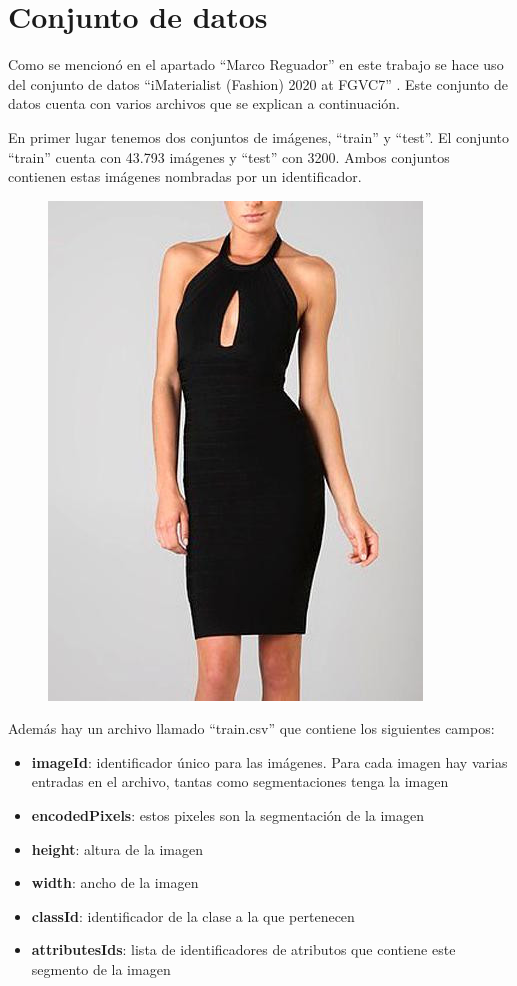\documentclass[12pt]{report} %
\begin{document}
	\section{Conjunto de datos}
	Como se mencionó en el apartado ``Marco Reguador'' en este trabajo se hace uso del conjunto de datos 
	``iMaterialist (Fashion) 2020 at FGVC7'' \cite{imaterialist}. Este conjunto de datos cuenta con varios archivos que se 
	explican a continuación.

	En primer lugar tenemos dos conjuntos de imágenes, ``train'' y ``test''. El conjunto ``train'' cuenta con 43.793 imágenes
	y ``test'' con 3200. Ambos conjuntos contienen estas imágenes nombradas por un identificador.
	\begin{figure}[H]
		{\includegraphics[scale=0.4]{ejemplo-dataset.jpg}}
	\end{figure}

	Además hay un archivo llamado ``train.csv'' que contiene los siguientes campos:
	\begin{itemize}
		\item \textbf{imageId}: identificador único para las imágenes. Para cada imagen hay varias entradas en el archivo, tantas como segmentaciones
		tenga la imagen
		\item \textbf{encodedPixels}: estos pixeles son la segmentación de la imagen
		\item \textbf{height}: altura de la imagen
		\item \textbf{width}: ancho de la imagen
		\item \textbf{classId}: identificador de la clase a la que pertenecen
		\item \textbf{attributesIds}: lista de identificadores de atributos que contiene este segmento de la imagen 
	\end{itemize}
\end{document}
